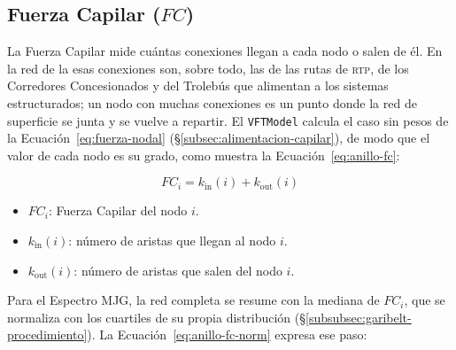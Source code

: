 %
%
\subsection{Fuerza Capilar (\texorpdfstring{$FC$}{FC})}
\label{subsec:anillo-fuerza-capilar}

La Fuerza Capilar mide cuántas conexiones llegan a cada nodo o salen de él. En
la red de la \zmvm{} esas conexiones son, sobre todo, las de las rutas de
\textsc{rtp}, de los Corredores Concesionados y del Trolebús que alimentan a
los sistemas estructurados; un nodo con muchas conexiones es un punto donde la
red de superficie se junta y se vuelve a repartir. El \texttt{VFTModel} calcula
el caso sin pesos de la Ecuación~\eqref{eq:fuerza-nodal}
(§\ref{subsec:alimentacion-capilar}), de modo que el valor de cada nodo es su
grado, como muestra la Ecuación~\eqref{eq:anillo-fc}:

\begin{equation}
    FC_i = k_{\text{in}}(i) + k_{\text{out}}(i)
    \label{eq:anillo-fc}
\end{equation}

\begin{itemize}
    \item $FC_i$: Fuerza Capilar del nodo $i$.
    \item $k_{\text{in}}(i)$: número de aristas que llegan al nodo $i$.
    \item $k_{\text{out}}(i)$: número de aristas que salen del nodo $i$.
\end{itemize}

Para el Espectro MJG, la red completa se resume con la mediana de $FC_i$, que
se normaliza con los cuartiles de su propia distribución
(§\ref{subsubsec:garibelt-procedimiento}). La Ecuación~\eqref{eq:anillo-fc-norm}
expresa ese paso:

